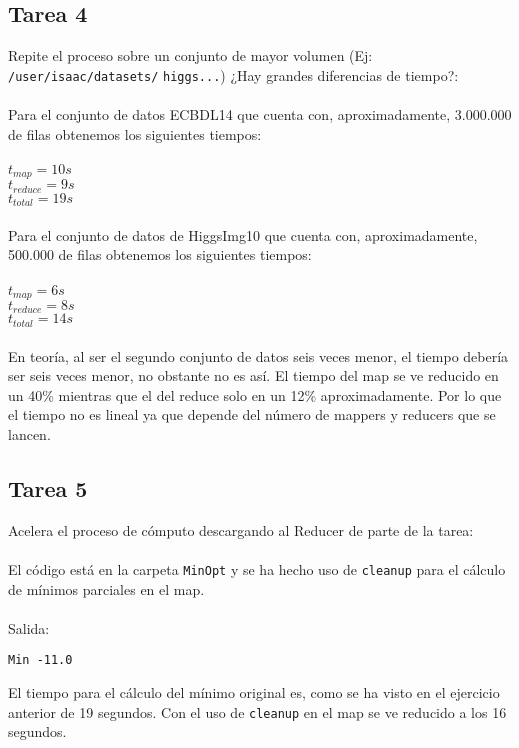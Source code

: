 \subsection{Tarea 4}

Repite el proceso sobre un conjunto de mayor volumen (Ej: \texttt{/user/isaac/datasets/} \texttt{higgs...}) ¿Hay grandes diferencias de tiempo?:
\\ \\
Para el conjunto de datos ECBDL14 que cuenta con, aproximadamente, 3.000.000 de filas obtenemos los siguientes tiempos:
\\ \\
$ t_{map} = 10s $
\\
$ t_{reduce} = 9s $
\\
$ t_{total} = 19s $
\\ \\
Para el conjunto de datos de HiggsImg10 que cuenta con, aproximadamente, 500.000 de filas obtenemos los siguientes tiempos:
\\ \\
$ t_{map} = 6s $
\\
$ t_{reduce} = 8s $
\\
$ t_{total} = 14s $
\\ \\
En teoría, al ser el segundo conjunto de datos seis veces menor, el tiempo debería ser seis veces menor, no obstante no es así. El tiempo del map se ve reducido en un 40\% mientras que el del reduce solo en un 12\% aproximadamente. Por lo que el tiempo no es lineal ya que depende del número de mappers y reducers que se lancen.

\subsection{Tarea 5}

Acelera el proceso de cómputo descargando al Reducer de parte de la tarea:
\\ \\
El código está en la carpeta \texttt{MinOpt} y se ha hecho uso de \texttt{cleanup} para el cálculo de mínimos parciales en el map.
\\ \\
Salida:

\begin{lstlisting}
Min -11.0
\end{lstlisting}

El tiempo para el cálculo del mínimo original es, como se ha visto en el ejercicio anterior de 19 segundos. Con el uso de \texttt{cleanup} en el map se ve reducido a los 16 segundos.




